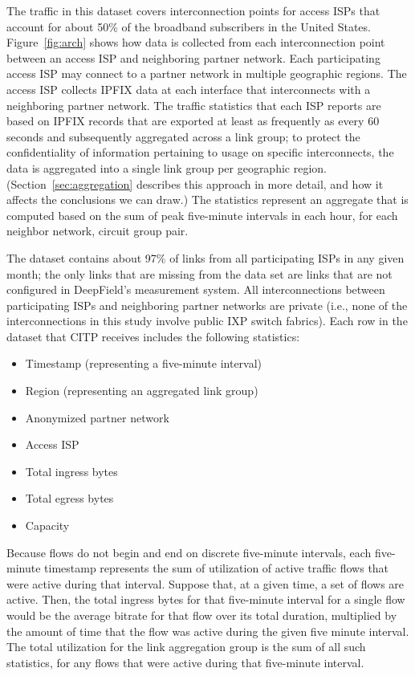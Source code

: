 The traffic in this dataset covers interconnection points
for access ISPs that account for about 50\% of the broadband subscribers in the United
States. 
Figure~\ref{fig:arch} shows how data is collected from each
interconnection point between an access ISP and neighboring partner network.  Each participating access
ISP may connect to a partner network in multiple geographic regions. The
access ISP collects IPFIX data at each interface that interconnects with
a neighboring partner network.
The traffic statistics that each ISP reports are based on IPFIX records
that are exported at least as frequently as every 60 seconds and subsequently
aggregated across a 
link group; to protect the confidentiality of information pertaining to
usage on specific interconnects, the data is aggregated into a single link group per geographic
region. (Section~\ref{sec:aggregation} describes this approach in more
detail, and how it affects the conclusions we can draw.) The statistics
represent an aggregate that is computed based on 
the sum of peak five-minute intervals in each hour, for each {neighbor
  network, circuit group} pair.

The dataset contains about 97\% of links from all participating ISPs in
any given month; the only links that are missing from the data set are
links that are not configured in DeepField's measurement system.  All
interconnections between participating ISPs and neighboring partner
networks are private (i.e., none of the interconnections in this study
involve public IXP switch fabrics).  Each row in the dataset that CITP
receives includes the following statistics:
\begin{itemize}
\itemsep=-1pt
\item	Timestamp (representing a five-minute interval)
\item	Region (representing an aggregated link group)
\item	Anonymized partner network
\item       Access ISP
\item	Total ingress bytes
\item	Total egress bytes
\item       Capacity
\end{itemize}
\noindent
Because flows do not begin and end on discrete five-minute intervals,
each five-minute timestamp represents the sum of utilization of active
traffic flows that were active during that interval. Suppose that, at a
given time, a set of flows are active. Then, the total ingress bytes for
that five-minute interval for a single flow would be the average bitrate
for that flow over its total duration, multiplied by the amount of time
that the flow was active during the given five minute interval. The
total utilization for the link aggregation group is the sum of all such
statistics, for any flows that were active during that five-minute
interval. 


